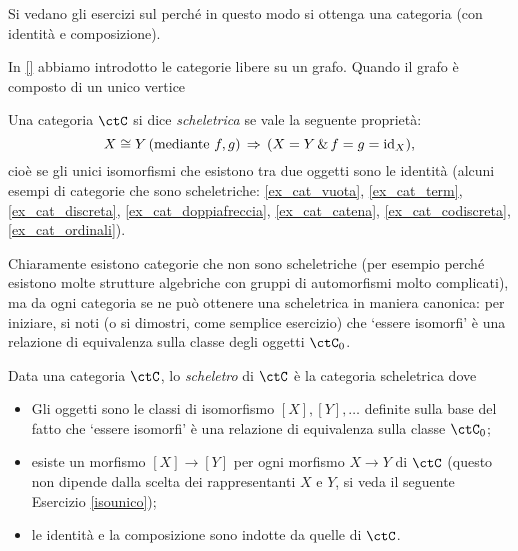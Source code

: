 Si vedano gli esercizi sul perché in questo modo si ottenga una categoria (con identità e composizione).
\begin{example}\label{mongruppi_liberi}
  In \ref{} abbiamo introdotto le categorie libere su un grafo. Quando il grafo è composto di un unico vertice
\end{example}
\begin{definition}\label{def_cat_scheletrica}
	Una categoria \(\ctC\) si dice \emph{scheletrica} se vale la seguente proprietà:
	\[X\cong Y \, (\text{mediante } f,g) \,\Rightarrow\, (X=Y \,\&\, f=g=\mathrm{id}_X),\]
	cioè se gli unici isomorfismi che esistono tra due oggetti sono le identità (alcuni esempi di categorie che sono scheletriche: \ref{ex_cat_vuota}, \ref{ex_cat_term}, \ref{ex_cat_discreta}, \ref{ex_cat_doppiafreccia}, \ref{ex_cat_catena}, \ref{ex_cat_codiscreta}, \ref{ex_cat_ordinali}).
\end{definition}
Chiaramente esistono categorie che non sono scheletriche (per esempio perché esistono molte strutture algebriche con gruppi di automorfismi molto complicati), ma da ogni categoria se ne può ottenere una scheletrica in maniera canonica: per iniziare, si noti (o si dimostri, come semplice esercizio) che `essere isomorfi' è una relazione di equivalenza sulla classe degli oggetti \(\ctC_0\).
\begin{definition}\label{def_scheletro}
	Data una categoria \(\ctC\), lo \emph{scheletro} di \(\ctC\) è la categoria scheletrica dove
	\begin{itemize}
    \item Gli oggetti sono le classi di isomorfismo $[X],[Y],\dots$ definite sulla base del fatto che `essere isomorfi' è una relazione di equivalenza sulla classe $\ctC_0$;
		\item esiste un morfismo \([X]\to[Y]\) per ogni morfismo \(X\to Y\) di \(\ctC\) (questo non dipende dalla scelta dei rappresentanti \(X\) e \(Y\), si veda il seguente Esercizio \ref{isounico});
		\item le identità e la composizione sono indotte da quelle di \(\ctC\).
	\end{itemize}
\end{definition}

